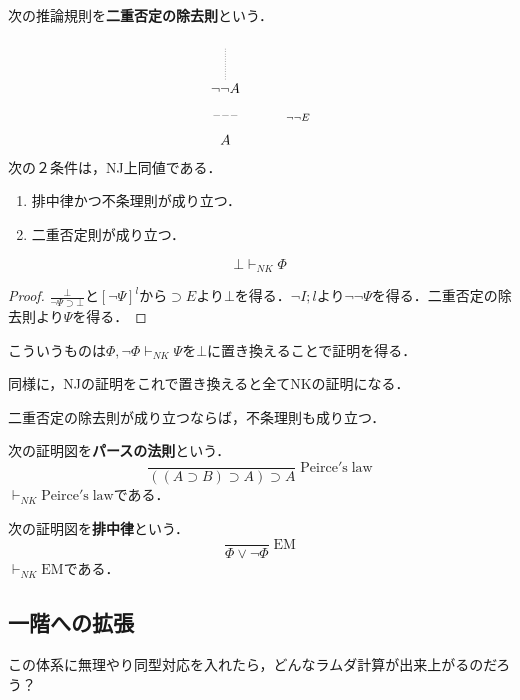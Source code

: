 \documentclass[uplatex, dvipdfmx]{jsreport}
\begin{document}
\begin{proposition}
    次の推論規則を\textbf{二重否定の除去則}という．
    \[
        \xymatrix{
            {}\ar@{.}[d]&\\{\lnot\lnot A}\ar@{}[d]|{---}&{}\ar@{}[d]^-{\lnot\lnot E}
            \\A&{}
        }
    \]
    次の２条件は，NJ上同値である．
    \begin{enumerate}
        \item 排中律かつ不条理則が成り立つ．
        \item 二重否定則が成り立つ．
    \end{enumerate}
\end{proposition}

\begin{proposition}[二重否定の除去則は不条理則よりも強い]
    \[\bot\vdash_{NK}\Phi\]
\end{proposition}
\begin{proof}
    $\frac{\bot}{\lnot\Psi\supset\bot}$と$[\lnot\Psi]^l$から$\supset E$より$\bot$を得る．$\lnot I;l$より$\lnot\lnot\Psi$を得る．二重否定の除去則より$\Psi$を得る．
\end{proof}
\begin{remark}
    こういうものは$\Phi,\lnot\Phi\vdash_{NK}\Psi$を$\bot$に置き換えることで証明を得る．

    同様に，NJの証明をこれで置き換えると全てNKの証明になる．
\end{remark}

\begin{proposition}[二重否定の除去則]
    二重否定の除去則が成り立つならば，不条理則も成り立つ．
\end{proposition}

\begin{proposition}
    次の証明図を\textbf{パースの法則}という．
    \[ \frac{}{((A\supset B)\supset A)\supset A}\;\mathrm{Peirce's\;law} \]
    $\vdash_{NK}\mathrm{Peirce's\;law}$である．
\end{proposition}

\begin{proposition}
    次の証明図を\textbf{排中律}という．
    \[ \frac{}{\Phi\lor\lnot\Phi}\;\mathrm{EM} \]
    $\vdash_{NK}\mathrm{EM}$である．
\end{proposition}

\subsection{一階への拡張}
この体系に無理やり同型対応を入れたら，どんなラムダ計算が出来上がるのだろう？
\end{document}
